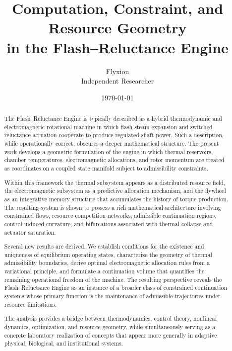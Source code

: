 \documentclass[12pt,a4paper]{article}
\title{Computation, Constraint, and Resource Geometry \\
in the Flash--Reluctance Engine}
\author{Flyxion \\
Independent Researcher}
\date{\today}
\begin{document}
\maketitle

\begin{abstract}
The Flash--Reluctance Engine is typically described as a hybrid thermodynamic and electromagnetic rotational machine in which flash-steam expansion and switched-reluctance actuation cooperate to produce regulated shaft power. Such a description, while operationally correct, obscures a deeper mathematical structure. The present work develops a geometric formulation of the engine in which thermal reservoirs, chamber temperatures, electromagnetic allocations, and rotor momentum are treated as coordinates on a coupled state manifold subject to admissibility constraints.

Within this framework the thermal subsystem appears as a distributed resource field, the electromagnetic subsystem as a predictive allocation mechanism, and the flywheel as an integrative memory structure that accumulates the history of torque production. The resulting system is shown to possess a rich mathematical architecture involving constrained flows, resource competition networks, admissible continuation regions, control-induced curvature, and bifurcations associated with thermal collapse and actuator saturation.

Several new results are derived. We establish conditions for the existence and uniqueness of equilibrium operating states, characterize the geometry of thermal admissibility boundaries, derive optimal electromagnetic allocation rules from a variational principle, and formulate a continuation volume that quantifies the remaining operational freedom of the machine. The resulting perspective reveals the Flash--Reluctance Engine as an instance of a broader class of constrained continuation systems whose primary function is the maintenance of admissible trajectories under resource limitations.

The analysis provides a bridge between thermodynamics, control theory, nonlinear dynamics, optimization, and resource geometry, while simultaneously serving as a concrete laboratory realization of concepts that appear more generally in adaptive physical, biological, and institutional systems.
\end{abstract}

\newpage
\tableofcontents
\newpage

\end{document}
